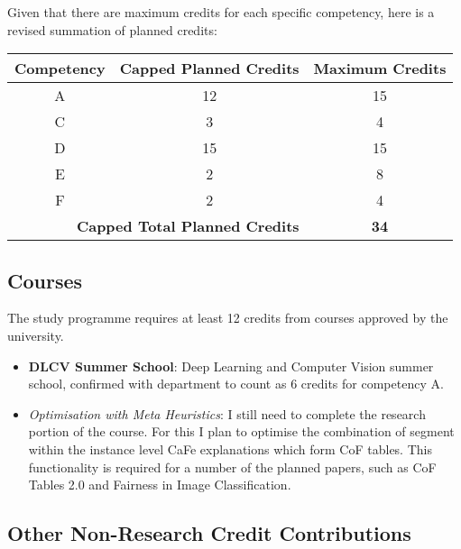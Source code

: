 Given that there are maximum credits for each specific competency, here is a revised summation of planned credits:

\begin{tabular}{|c|c|c|}
    \hline
    \textbf{Competency} & \textbf{Capped Planned Credits} & \textbf{Maximum Credits} \\ \hline
    A                   & 12                              & 15                       \\ \hline
    C                   & 3                               & 4                        \\ \hline
    D                   & 15                              & 15                       \\ \hline
    E                   & 2                               & 8                        \\ \hline
    F                   & 2                               & 4                        \\ \hline
    \multicolumn{2}{|r|}{\textbf{Capped Total Planned Credits}} & \textbf{34}      \\ \hline
\end{tabular}

\subsection*{Courses}

The study programme requires at least 12 credits from courses approved by the university.
\begin{itemize}
    \item \textbf{DLCV Summer School}:
     Deep Learning and Computer Vision summer school, confirmed with department
    to count as 6 credits for competency A.
    \item \textit{Optimisation with Meta Heuristics}:
    I still need to complete the research portion of the course.
    For this I plan to optimise the combination of segment within the instance level CaFe explanations which form 
    CoF tables.
    This functionality is required for a number of the planned papers, such as CoF Tables 2.0 and 
    Fairness in Image Classification. 
\end{itemize}

\subsection*{Other Non-Research Credit Contributions}

